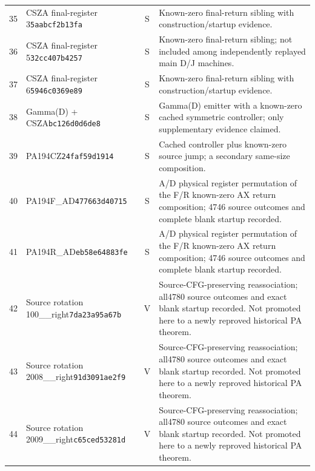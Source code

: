 \begin{longtable}{@{}rp{}cp{}@{}}
35 & CSZA final-register 3\newline\texttt{5aabcf2b13fa} & S & Known-zero final-return sibling with construction/startup evidence.\\[5pt]
36 & CSZA final-register 5\newline\texttt{32cc407b4257} & S & Known-zero final-return sibling; not included among independently replayed main D/J machines.\\[5pt]
37 & CSZA final-register 6\newline\texttt{5946c0369e89} & S & Known-zero final-return sibling with construction/startup evidence.\\[5pt]
38 & Gamma(D) + CSZA\newline\texttt{bc126d0d6de8} & S & Gamma(D) emitter with a known-zero cached symmetric controller; only supplementary evidence claimed.\\[5pt]
39 & PA194CZ\newline\texttt{24faf59d1914} & S & Cached controller plus known-zero source jump; a secondary same-size composition.\\[5pt]
40 & PA194F\_\allowbreak AD\newline\texttt{477663d40715} & S & A/D physical register permutation of the F/R known-zero AX return composition; 4746 source outcomes and complete blank startup recorded.\\[5pt]
41 & PA194R\_\allowbreak AD\newline\texttt{eb58e64883fe} & S & A/D physical register permutation of the F/R known-zero AX return composition; 4746 source outcomes and complete blank startup recorded.\\[5pt]
42 & Source rotation 100\_\allowbreak 174\_\allowbreak right\newline\texttt{7da23a95a67b} & V & Source-CFG-preserving reassociation; all4780 source outcomes and exact blank startup recorded. Not promoted here to a newly reproved historical PA theorem.\\[5pt]
43 & Source rotation 2008\_\allowbreak 2009\_\allowbreak right\newline\texttt{91d3091ae2f9} & V & Source-CFG-preserving reassociation; all4780 source outcomes and exact blank startup recorded. Not promoted here to a newly reproved historical PA theorem.\\[5pt]
44 & Source rotation 2009\_\allowbreak 2010\_\allowbreak right\newline\texttt{c65ced53281d} & V & Source-CFG-preserving reassociation; all4780 source outcomes and exact blank startup recorded. Not promoted here to a newly reproved historical PA theorem.\\[5pt]

\end{longtable}
